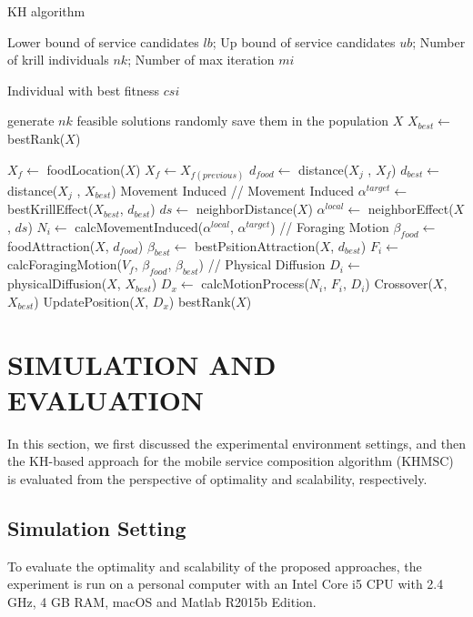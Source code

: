 \documentclass[10pt,journal,compsoc]{IEEEtran}
\begin{document}
\begin{algorithm}
\caption{KH algorithm}
\label{alg2}
\begin{algorithmic}[1]

\REQUIRE Lower bound of service candidates $lb$; Up bound of service candidates $ub$; Number of krill individuals $nk$; Number of max iteration $mi$

\ENSURE Individual with best fitness $csi$

\STATE generate $nk$ feasible solutions randomly
\STATE save them in the population $X$
\STATE $X_{best} \leftarrow$ bestRank($X$)

  \STATE $X_f \leftarrow$ foodLocation($X$)
    \STATE $X_f \leftarrow X_{f(previous)}$
  \ENDIF
    \STATE $d_{food} \leftarrow$ distance($X_j$ , $X_f$)
    \STATE $d_{best} \leftarrow$ distance($X_j$ , $X_{best}$)
    \algorithmiccomment Movement Induced
    \STATE // Movement Induced    
    \STATE $\alpha^{target} \leftarrow $ bestKrillEffect($X_{best}$, $d_{best}$) 
    \STATE $ds \leftarrow $ neighborDistance($X$)
    \STATE $\alpha^{local} \leftarrow $ neighborEffect($X$, $ds$)
    \STATE $N_i \leftarrow$ calcMovementInduced($\alpha^{local}$, $\alpha^{target}$)
    \STATE // Foraging Motion
    \STATE $\beta_{food} \leftarrow$ foodAttraction($X$, $d_{food}$)
    \STATE $\beta_{best} \leftarrow$ bestPsitionAttraction($X$, $d_{best}$)
    \STATE $F_i \leftarrow$ calcForagingMotion($V_f$, $\beta_{food}$, $\beta_{best}$)
    \STATE // Physical Diffusion
    \STATE $D_i \leftarrow$ physicalDiffusion($X$, $X_{best}$)
    \STATE $D_x \leftarrow$ calcMotionProcess($N_i$, $F_i$, $D_i$)
    \STATE Crossover($X$, $X_{best}$)
    \STATE UpdatePosition($X$, $D_x$)
  \ENDFOR
\ENDFOR
\RETURN bestRank($X$)

\end{algorithmic}
\end{algorithm}

\section{SIMULATION AND EVALUATION}
In this section, we first discussed the experimental environment settings, and then the KH-based approach for the mobile service composition algorithm (KHMSC) is evaluated from the perspective of optimality and scalability, respectively.
\subsection{Simulation Setting}
To evaluate the optimality and scalability of the proposed approaches, the experiment is run on a personal computer with an Intel Core i5 CPU with 2.4 GHz, 4 GB RAM, macOS and Matlab R2015b Edition.
\end{document}
